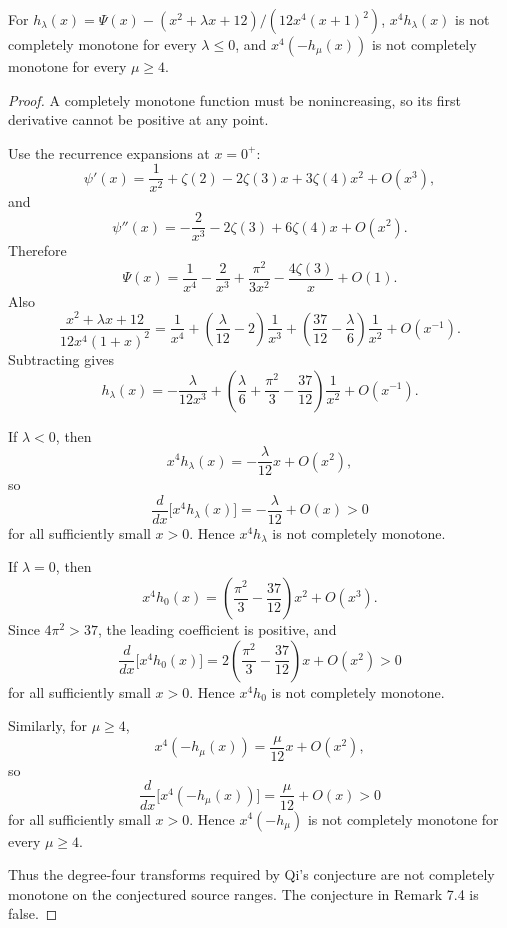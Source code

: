 \begin{counterexample}
\label{res:qi-hlambda-x4-source-range-not-cm}
For \(h_\lambda(x)=\Psi(x)-(x^2+\lambda x+12)/(12x^4(x+1)^2)\), \(x^4h_\lambda(x)\) is not completely monotone for every \(\lambda\le0\), and \(x^4(-h_\mu(x))\) is not completely monotone for every \(\mu\ge4\).
\end{counterexample}
\begin{proof}
A completely monotone function must be nonincreasing, so its first derivative cannot be positive at any point.

Use the recurrence expansions at \(x=0^+\):
\[
\psi'(x)=\frac1{x^2}+\zeta(2)-2\zeta(3)x+3\zeta(4)x^2+O(x^3),
\]
and
\[
\psi''(x)=-\frac2{x^3}-2\zeta(3)+6\zeta(4)x+O(x^2).
\]
Therefore
\[
\Psi(x)
=\frac1{x^4}-\frac2{x^3}+\frac{\pi^2}{3x^2}
-\frac{4\zeta(3)}x+O(1).
\]
Also
\[
\frac{x^2+\lambda x+12}{12x^4(1+x)^2}
=\frac1{x^4}+\left(\frac{\lambda}{12}-2\right)\frac1{x^3}
+\left(\frac{37}{12}-\frac{\lambda}{6}\right)\frac1{x^2}
+O(x^{-1}).
\]
Subtracting gives
\[
h_\lambda(x)
=-\frac{\lambda}{12x^3}
+\left(\frac{\lambda}{6}+\frac{\pi^2}{3}-\frac{37}{12}\right)\frac1{x^2}
+O(x^{-1}).
\]

If \(\lambda<0\), then
\[
x^4h_\lambda(x)=-\frac{\lambda}{12}x+O(x^2),
\]
so
\[
\frac{d}{dx}\bigl[x^4h_\lambda(x)\bigr]
=-\frac{\lambda}{12}+O(x)>0
\]
for all sufficiently small \(x>0\). Hence \(x^4h_\lambda\) is not completely monotone.

If \(\lambda=0\), then
\[
x^4h_0(x)
=\left(\frac{\pi^2}{3}-\frac{37}{12}\right)x^2+O(x^3).
\]
Since \(4\pi^2>37\), the leading coefficient is positive, and
\[
\frac{d}{dx}\bigl[x^4h_0(x)\bigr]
=2\left(\frac{\pi^2}{3}-\frac{37}{12}\right)x+O(x^2)>0
\]
for all sufficiently small \(x>0\). Hence \(x^4h_0\) is not completely monotone.

Similarly, for \(\mu\ge4\),
\[
x^4(-h_\mu(x))=\frac{\mu}{12}x+O(x^2),
\]
so
\[
\frac{d}{dx}\bigl[x^4(-h_\mu(x))\bigr]
=\frac{\mu}{12}+O(x)>0
\]
for all sufficiently small \(x>0\). Hence \(x^4(-h_\mu)\) is not completely monotone for every \(\mu\ge4\).

Thus the degree-four transforms required by Qi's conjecture are not completely monotone on the conjectured source ranges. The conjecture in Remark 7.4 is false.
\end{proof}

